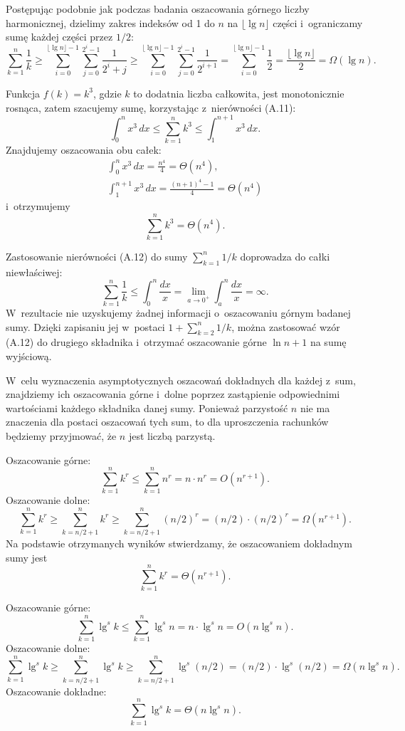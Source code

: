 \exercise %
Postępując podobnie jak podczas badania oszacowania górnego  liczby harmonicznej, dzielimy zakres indeksów od 1 do $n$ na $\lfloor\lg n\rfloor$ części i~ograniczamy sumę każdej części przez $1/2$:
\[
    \sum_{k=1}^n\frac{1}{k} \ge \sum_{i=0}^{\lfloor\lg n\rfloor-1}\sum_{j=0}^{2^i-1}\frac{1}{2^i+j} \ge \sum_{i=0}^{\lfloor\lg n\rfloor-1}\sum_{j=0}^{2^i-1}\frac{1}{2^{i+1}} = \sum_{i=0}^{\lfloor\lg n\rfloor-1}\frac{1}{2} = \frac{\lfloor\lg n\rfloor}{2} = \Omega(\lg n).
\]

\exercise %
Funkcja $f(k)=k^3$, gdzie $k$ to dodatnia liczba całkowita, jest monotonicznie rosnąca, zatem szacujemy sumę, korzystając z~nierówności (A.11):
\[
	\int_0^nx^3\,dx \le \sum_{k=1}^nk^3 \le \int_1^{n+1}x^3\,dx.
\]
Znajdujemy oszacowania obu całek:
\begin{gather*}
	\int_0^nx^3\,dx = \frac{n^4}{4} = \Theta(n^4), \\[2mm]
	\int_1^{n+1}x^3\,dx = \frac{(n+1)^4-1}{4} = \Theta(n^4)
\end{gather*}
i~otrzymujemy
\[
	\sum_{k=1}^nk^3 = \Theta(n^4).
\]

\exercise %
Zastosowanie nierówności (A.12) do sumy $\sum_{k=1}^n1/k$ doprowadza do całki niewłaściwej:
\[
	\sum_{k=1}^n\frac{1}{k} \le \int_0^n\frac{dx}{x} = \lim_{a\to0^+}\int_a^n\frac{dx}{x} = \infty.
\]
W~rezultacie nie uzyskujemy żadnej informacji o~oszacowaniu górnym badanej sumy.
Dzięki zapisaniu jej w~postaci $1+\sum_{k=2}^n1/k$, można zastosować wzór (A.12) do drugiego składnika i~otrzymać oszacowanie górne $\ln n+1$ na sumę wyjściową.

\problems

W~celu wyznaczenia asymptotycznych oszacowań dokładnych dla każdej z~sum, znajdziemy ich oszacowania górne i~dolne poprzez zastąpienie odpowiednimi wartościami każdego składnika danej sumy.
Ponieważ parzystość $n$ nie ma znaczenia dla postaci oszacowań tych sum, to dla uproszczenia rachunków będziemy przyjmować, że $n$ jest liczbą parzystą.

\subproblem %
Oszacowanie górne:
\[
    \sum_{k=1}^nk^r \le \sum_{k=1}^nn^r = n\cdot n^r = O(n^{r+1}).
\]
Oszacowanie dolne:
\[
    \sum_{k=1}^nk^r \ge \sum_{k=n/2+1}^nk^r \ge \sum_{k=n/2+1}^n(n/2)^r = (n/2)\cdot(n/2)^r = \Omega(n^{r+1}).
\]
Na podstawie otrzymanych wyników stwierdzamy, że oszacowaniem dokładnym sumy jest
\[
    \sum_{k=1}^nk^r = \Theta(n^{r+1}).
\]

\subproblem %
Oszacowanie górne:
\[
    \sum_{k=1}^n\lg^sk \le \sum_{k=1}^n\lg^sn = n\cdot\lg^sn = O(n\lg^sn).
\]
Oszacowanie dolne:
\[
    \sum_{k=1}^n\lg^sk \ge \sum_{k=n/2+1}^n\lg^sk \ge \sum_{k=n/2+1}^n\lg^s(n/2) = (n/2)\cdot\lg^s(n/2) = \Omega(n\lg^sn).
\]
Oszacowanie dokładne:
\[
    \sum_{k=1}^n\lg^sk = \Theta(n\lg^sn).
\]

